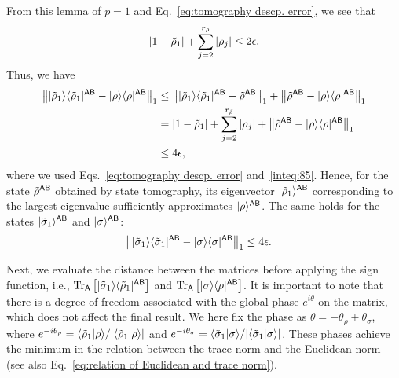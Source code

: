 From this lemma of $p=1$ and Eq.~\eqref{eq:tomography descp. error}, we see that
\begin{align}
\label{inteq:85}
    |1 - \tilde{\rho}_1| + \sum_{j=2}^{r_{\tilde{\rho}}} |\rho_j| \leq 2\epsilon.
\end{align}
Thus, we have 
\begin{align}
    \big\||\tilde{\rho}_1\rangle\langle\tilde{\rho}_1|^{{\mathsf{A}}{\mathsf{B}}} - |\rho\rangle\langle\rho|^{{\mathsf{A}}{\mathsf{B}}}\big\|_1 
    &\leq \big\||\tilde{\rho}_1\rangle\langle\tilde{\rho}_1|^{{\mathsf{A}}{\mathsf{B}}} - \tilde{\rho}^{{\mathsf{A}}{\mathsf{B}}}\big\|_1 + \big\|\tilde{\rho}^{{\mathsf{A}}{\mathsf{B}}} - |\rho\rangle\langle\rho|^{{\mathsf{A}}{\mathsf{B}}}\big\|_1 \\
    &= |1 - \tilde{\rho}_1| + \sum_{j=2}^{r_{\tilde{\rho}}} |\rho_j| + \big\|\tilde{\rho}^{{\mathsf{A}}{\mathsf{B}}} - |\rho\rangle\langle\rho|^{{\mathsf{A}}{\mathsf{B}}}\big\|_1 \\
    \label{inteq:86}
    &\leq 4 \epsilon,
\end{align}
where we used Eqs.~\eqref{eq:tomography descp. error} and~\eqref{inteq:85}.
Hence, for the state $\tilde{\rho}^{{\mathsf{A}}{\mathsf{B}}}$ obtained by state tomography, its eigenvector $|\tilde{\rho}_1\rangle^{{\mathsf{A}}{\mathsf{B}}}$ corresponding to the largest eigenvalue sufficiently approximates $|\rho\rangle^{{\mathsf{A}}{\mathsf{B}}}$.
The same holds for the states $|\tilde{\sigma}_1\rangle^{{\mathsf{A}}{\mathsf{B}}}$ and $|\sigma\rangle^{{\mathsf{A}}{\mathsf{B}}}$:
\begin{align}
    \label{inteq:107}
    \big\||\tilde{\sigma}_1\rangle\langle\tilde{\sigma}_1|^{{\mathsf{A}}{\mathsf{B}}} - |\sigma\rangle\langle\sigma|^{{\mathsf{A}}{\mathsf{B}}}\big\|_1
    &\leq 4 \epsilon.
\end{align}

Next, we evaluate the distance between the matrices before applying the sign function, i.e., $\operatorname{Tr}_{\mathsf{A}}\big[|\tilde{\sigma}_1\rangle\langle\tilde{\rho}_1|^{{\mathsf{A}}{\mathsf{B}}}\big]$ and $\operatorname{Tr}_{\mathsf{A}}\big[|\sigma\rangle\langle\rho|^{{\mathsf{A}}{\mathsf{B}}}\big]$.
It is important to note that there is a degree of freedom associated with the global phase $e^{i\theta}$ on the matrix, which does not affect the final result. 
We here fix the phase as $\theta = -\theta_\rho + \theta_\sigma$, where $e^{-i\theta_\rho} = \langle \tilde{\rho}_1 \vert \rho \rangle / |\langle \tilde{\rho}_1 \vert \rho \rangle|$ and $e^{-i\theta_\sigma} = \langle \tilde{\sigma}_1 \vert \sigma \rangle/|\langle \tilde{\sigma}_1 \vert \sigma \rangle|$.
These phases achieve the minimum in the relation between the trace norm and the Euclidean norm (see also Eq.~\eqref{eq:relation of Euclidean and trace norm}).

